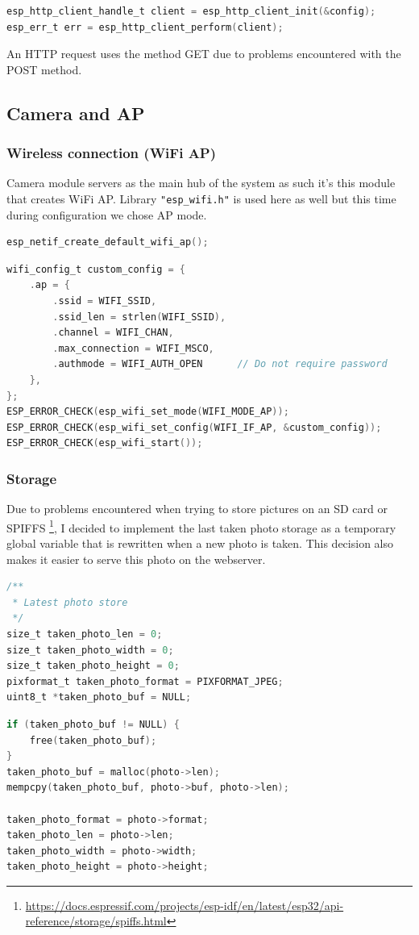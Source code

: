 \documentclass{article}
\begin{document}
    \begin{lstlisting}[language=C]
esp_http_client_handle_t client = esp_http_client_init(&config);
esp_err_t err = esp_http_client_perform(client);
    \end{lstlisting}
    
    An HTTP request uses the method GET due to problems encountered with the POST method.
    
    \clearpage
    \subsection{Camera and AP}
    \subsubsection{Wireless connection (WiFi AP)}
    Camera module servers as the main hub of the system as such it's this module
    that creates WiFi AP. Library \verb|"esp_wifi.h"| is used here as well but this time
    during configuration we chose AP mode.
    \begin{lstlisting}[language=C]
esp_netif_create_default_wifi_ap();
    \end{lstlisting}
    \begin{lstlisting}[language=C]
wifi_config_t custom_config = {
    .ap = {
        .ssid = WIFI_SSID,
        .ssid_len = strlen(WIFI_SSID),
        .channel = WIFI_CHAN,
        .max_connection = WIFI_MSCO,
        .authmode = WIFI_AUTH_OPEN      // Do not require password
    },
};
ESP_ERROR_CHECK(esp_wifi_set_mode(WIFI_MODE_AP));
ESP_ERROR_CHECK(esp_wifi_set_config(WIFI_IF_AP, &custom_config));
ESP_ERROR_CHECK(esp_wifi_start());
    \end{lstlisting}
    
    \subsubsection{Storage}
    Due to problems encountered when trying to store pictures on an SD card or SPIFFS
    \footnote{\url{https://docs.espressif.com/projects/esp-idf/en/latest/esp32/api-reference/storage/spiffs.html}},
     I decided to implement the last taken photo storage as a temporary global
     variable that is rewritten when a new photo is taken. This decision also makes it easier
     to serve this photo on the webserver.
     \begin{lstlisting}[language=C]
/**
 * Latest photo store 
 */
size_t taken_photo_len = 0;
size_t taken_photo_width = 0;
size_t taken_photo_height = 0;
pixformat_t taken_photo_format = PIXFORMAT_JPEG;
uint8_t *taken_photo_buf = NULL; 
    \end{lstlisting}
    \begin{lstlisting}[language=C]
if (taken_photo_buf != NULL) {
    free(taken_photo_buf);
}
taken_photo_buf = malloc(photo->len);
mempcpy(taken_photo_buf, photo->buf, photo->len);

taken_photo_format = photo->format;
taken_photo_len = photo->len;
taken_photo_width = photo->width;
taken_photo_height = photo->height;
    \end{lstlisting}
    
\end{document}
